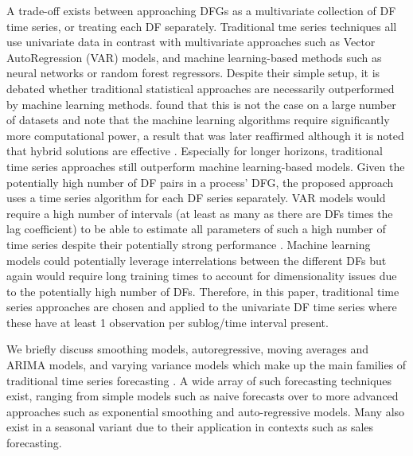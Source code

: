 A trade-off exists between approaching DFGs as a multivariate collection of DF time series, or treating each DF separately.
Traditional tme series techniques all use univariate data in contrast with multivariate approaches such as Vector AutoRegression (VAR) models, and machine learning-based methods such as neural networks or random forest regressors.
Despite their simple setup, it is debated whether traditional statistical approaches are necessarily outperformed by machine learning methods. 
\cite{makridakis2018statistical} found that this is not the case on a large number of datasets and note that the machine learning algorithms require significantly more computational power, a result that was later reaffirmed although it is noted that hybrid solutions are effective \cite{makridakis2020m4}.
Especially for longer horizons, traditional time series approaches still outperform machine learning-based models.
Given the potentially high number of DF pairs in a process' DFG, the proposed approach uses a time series algorithm for each DF series separately.
VAR models would require a high number of intervals (at least as many as there are DFs times the lag coefficient) to be able to estimate all parameters of such a high number of time series despite their potentially strong performance \cite{thomakos2004naive}.
Machine learning models could potentially leverage interrelations between the different DFs but again would require long training times to account for dimensionality issues due to the potentially high number of DFs. 
Therefore, in this paper, traditional time series approaches are chosen and applied to the univariate DF time series where these have at least 1 observation per sublog/time interval present.

We briefly discuss smoothing models, autoregressive, moving averages and ARIMA models, and varying variance models which make up the main families of traditional time series forecasting \cite{hyndman2018forecasting}.
A wide array of such forecasting techniques exist, ranging from simple models such as naive forecasts over to more advanced approaches such as exponential smoothing and auto-regressive models.
Many also exist in a seasonal variant due to their application in contexts such as sales forecasting.

